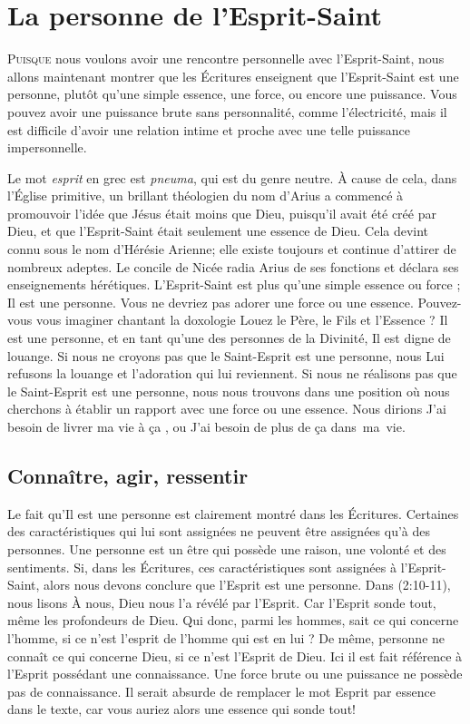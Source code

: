 \chapter{La personne de l'Esprit-Saint}

\lettrine{P}{uisque} nous voulons avoir une rencontre personnelle avec
 l'Esprit-Saint, nous allons maintenant montrer que les Écritures enseignent
 que l'Esprit-Saint est une personne, plutôt qu'une simple essence, une force, ou
 encore une puissance. Vous pouvez avoir une puissance brute sans personnalité,
 comme l'électricité, mais il est difficile d'avoir une relation intime et
 proche avec une telle puissance impersonnelle.

Le mot \emph{esprit} en grec est \emph{pneuma}, qui est du genre neutre.
 À cause de cela, dans l'Église primitive, un brillant théologien du nom
 d'Arius a commencé à promouvoir l'idée que Jésus était moins que Dieu,
 puisqu'il avait été créé par Dieu, et que l'Esprit-Saint était seulement
 une \Og essence \Fg{} de Dieu. Cela devint connu sous le nom d'Hérésie
 Arienne; elle existe toujours et continue d'attirer de nombreux adeptes. Le concile de
 Nicée radia Arius de ses fonctions et déclara ses enseignements hérétiques.
 L'Esprit-Saint est plus qu'une simple essence ou force ; Il est
 une personne. Vous ne devriez pas adorer une force ou une essence.
 Pouvez-vous vous imaginer chantant la doxologie\frcolon{}
 \Og Louez le Père, le Fils et l'Essence \Fg{} ?
 Il est une personne, et en tant qu'une des personnes
 de la Divinité, Il est digne de louange. Si nous ne croyons pas que le
 Saint-Esprit est une personne, nous Lui refusons la louange et l'adoration qui lui
 reviennent. Si nous ne réalisons pas que le Saint-Esprit est une personne,
 nous nous trouvons dans une position où nous cherchons à établir un
 rapport avec une force ou une essence. Nous dirions\frcolon{} \Og J'ai besoin de livrer
 ma vie à ça \Fg{}, ou\frcolon{} \Og J'ai besoin de plus de ça dans~ma~vie.\Fg


\section{Conna\^itre, agir, ressentir}

Le fait qu'Il est une personne est clairement montré dans les Écritures.
 Certaines des caractéristiques qui lui sont assignées ne peuvent être assignées
 qu'à des personnes. Une personne est un être qui possède une raison,
 une volonté et des sentiments.
 Si, dans les Écritures, ces caractéristiques sont assignées à
 l'Esprit-Saint, alors nous devons conclure que l'Esprit est une personne.
 Dans (2:10-11), nous lisons\frcolon{} \Og À nous, Dieu nous l'a
 révélé par l'Esprit. Car l'Esprit sonde tout, même les profondeurs de Dieu.
 Qui donc, parmi les hommes, sait ce qui concerne l'homme, si ce n'est
 l'esprit de l'homme qui est en lui ? De même, personne ne connaît ce qui
 concerne Dieu, si ce n'est l'Esprit de Dieu. \Fg{} Ici il est fait référence
 à l'Esprit possédant une connaissance. Une force brute ou une puissance ne
 possède pas de connaissance. Il serait absurde de remplacer le mot
 \Og Esprit \Fg{} par \Og essence \Fg{} dans le texte, car vous auriez alors
 une \Og essence \Fg{} qui sonde tout!

